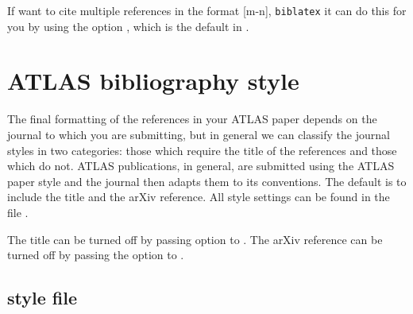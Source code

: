 \documentclass[UKenglish, texlive=2016]{\ATLASLATEXPATH atlasdoc}
\begin{document}
If want to cite multiple references in the format [m-n],
\texttt{biblatex} it can do this for you by using the option ,
which is the default in .


\section{ATLAS bibliography style}
\label{sec:atlasbst}

The final formatting of the references in your ATLAS paper depends on the journal to which you are submitting,
but in general we can classify the journal styles in two categories:
those which require the title of the references and those which do not.
ATLAS publications, in general, are submitted using the ATLAS paper style
and the journal then adapts them to its conventions.
The default is to include the title and the arXiv reference.
All  style settings can be found in the file .

The title can be turned off by passing option  to .
The arXiv reference can be turned off by passing the option  to .


\subsection{ style file}
\end{document}
